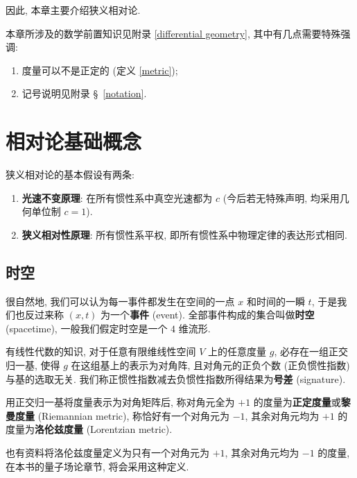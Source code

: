 因此, 本章主要介绍狭义相对论. 
\begin{remark}
本章所涉及的数学前置知识见附录 \ref{differential geometry}, 其中有几点需要特殊强调:
\begin{enumerate}
    \item 度量可以不是正定的 (定义 \ref{metric});
    \item 记号说明见附录 \S\, \ref{notation}.
\end{enumerate}
\end{remark}

\section{相对论基础概念}
狭义相对论的基本假设有两条:
\begin{enumerate}
    \item {\bf 光速不变原理}: 在所有惯性系中真空光速都为 $ c $ (今后若无特殊声明, 均采用几何单位制 $ c=1 $).
    \item {\bf 狭义相对性原理}: 所有惯性系平权, 即所有惯性系中物理定律的表达形式相同.
\end{enumerate}
\subsection{时空}
很自然地, 我们可以认为每一事件都发生在空间的一点 $ x $ 和时间的一瞬 $ t $, 于是我们也反过来称 $ (x,t) $ 为一个{\bf 事件} (event). 全部事件构成的集合叫做{\bf 时空} (spacetime), 一般我们假定时空是一个 $ 4 $ 维流形.

有线性代数的知识, 对于任意有限维线性空间 $ V $ 上的任意度量 $ g $, 必存在一组正交归一基, 使得 $ g $ 在这组基上的表示为对角阵, 且对角元的正负个数 (正负惯性指数) 与基的选取无关. 我们称正惯性指数减去负惯性指数所得结果为{\bf 号差} (signature).

用正交归一基将度量表示为对角矩阵后, 称对角元全为 $ +1 $ 的度量为{\bf 正定度量}或{\bf 黎曼度量} (Riemannian metric), 称恰好有一个对角元为 $ -1 $, 其余对角元均为 $ +1 $ 的度量为{\bf 洛伦兹度量} (Lorentzian metric).

\begin{remark}
    也有资料将洛伦兹度量定义为只有一个对角元为 $ +1 $, 其余对角元均为 $-1$ 的度量, 在本书的量子场论章节, 将会采用这种定义.
\end{remark}

